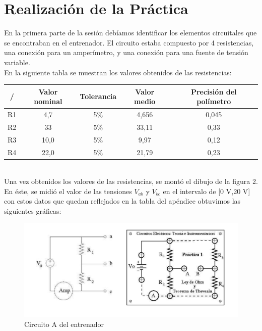 \documentclass[a4paper,11pt]{article}
\begin{document}
\newpage
\section{Realización de la Práctica}
En la primera parte de la sesión debíamos identificar los elementos circuitales que se encontraban en el entrenador. El circuito estaba compuesto por 4 resistencias, una conexión para un amperímetro, y una conexión para una fuente de tensión variable.\\
En la siguiente tabla se muestran los valores obtenidos de las resistencias:\\

\begin{tabular}{|c|c|c|c|c|}
\hline 
/ & Valor nominal & Tolerancia & Valor medio & Precisión del polímetro \\ 
\hline 
R1 & 4,7 & 5\% & 4,656 & 0,045 \\ 
\hline 
R2 & 33 & 5\% & 33,11 & 0,33 \\ 
\hline 
R3 & 10,0 & 5\% & 9,97 & 0,12 \\ 
\hline 
R4 & 22,0 & 5\% & 21,79 & 0,23 \\ 
\hline 
\end{tabular}\\

Una vez obtenidos los valores de las resistencias, se montó el dibujo de la figura 2. En éste, se midió el valor de las tensiones $V_{ab}$ y $V_{bc}$ en el intervalo de [0 V,20 V] con estos datos que quedan reflejados en la tabla del apéndice obtuvimos las siguientes gráficas:


\begin{figure}[hbtp]
\centering
\includegraphics[scale=0.5]{Imagenes/Entrenador.png}
\caption{Circuito A del entrenador}
\end{figure}
\end{document}
